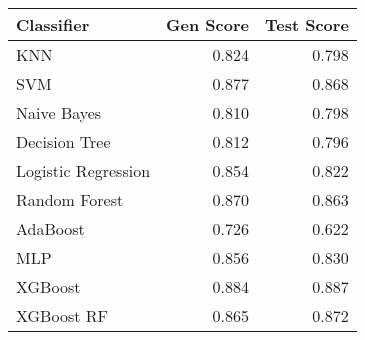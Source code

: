 \begin{tabular}{lrr}
\toprule
Classifier & Gen Score & Test Score \\
\midrule
KNN & 0.824 & 0.798 \\
SVM & 0.877 & 0.868 \\
Naive Bayes & 0.810 & 0.798 \\
Decision Tree & 0.812 & 0.796 \\
Logistic Regression & 0.854 & 0.822 \\
Random Forest & 0.870 & 0.863 \\
AdaBoost & 0.726 & 0.622 \\
MLP & 0.856 & 0.830 \\
XGBoost & 0.884 & 0.887 \\
XGBoost RF & 0.865 & 0.872 \\
\bottomrule
\end{tabular}
